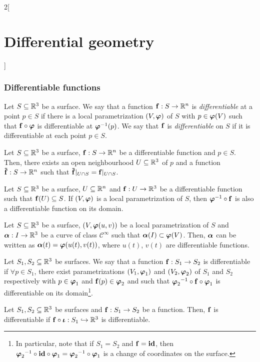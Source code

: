 \documentclass[../../../main_math.tex]{subfiles}
\begin{document}
\begin{multicols}{2}[\section{Differential geometry}]
  \subsubsection{Differentiable functions}
  \begin{definition}
    Let $S\subseteq\mathbb{R}^3$ be a surface. We say that a function $\boldsymbol{\mathrm{f}}:S\rightarrow \mathbb{R}^n$ is \emph{differentiable} at a point $p\in S$ if there is a local parametrization $(V,\boldsymbol{\mathrm{\varphi}})$ of $S$ with $p\in\boldsymbol{\mathrm{\varphi}}(V)$ such that $\boldsymbol{\mathrm{f}}\circ\boldsymbol{\mathrm{\varphi}}$ is differentiable at ${\boldsymbol{\mathrm{\varphi}}}^{-1}(p)$. We say that $\boldsymbol{\mathrm{f}}$ is \emph{differentiable} on $S$ if it is differentiable at each point $p\in S$.
  \end{definition}
  \begin{proposition}
    Let $S\subseteq\mathbb{R}^3$ be a surface, $\boldsymbol{\mathrm{f}}:S\rightarrow \mathbb{R}^n$ be a differentiable function and $p\in S$. Then, there exists an open neighbourhood $U\subseteq\mathbb{R}^3$ of $p$ and a function $\boldsymbol{\mathrm{\tilde{f}}}:S\rightarrow \mathbb{R}^n$ such that $\boldsymbol{\mathrm{\tilde{f}}}|_{U\cap S}=\boldsymbol{\mathrm{f}}|_{U\cap S}$.
  \end{proposition}
  \begin{corollary}
    Let $S\subseteq\mathbb{R}^3$ be a surface, $U\subseteq \mathbb{R}^n$ and $\boldsymbol{\mathrm{f}}:U\rightarrow \mathbb{R}^3$ be a differentiable function such that $\boldsymbol{\mathrm{f}}(U)\subseteq S$. If $(V,\boldsymbol{\mathrm{\varphi}})$ is a local parametrization of $S$, then ${\boldsymbol{\mathrm{\varphi}}}^{-1}\circ\boldsymbol{\mathrm{f}}$ is also a differentiable function on its domain.
  \end{corollary}
  \begin{corollary}
    Let $S\subseteq\mathbb{R}^3$ be a surface, $(V,\boldsymbol{\mathrm{\varphi}}(u,v))$ be a local parametrization of $S$ and $\boldsymbol{\mathrm{\alpha}}:I\rightarrow\mathbb{R}^3$ be a curve of class $\mathcal{C}^\infty$ such that $\boldsymbol{\mathrm{\alpha}}(I)\subset \boldsymbol{\mathrm{\varphi}}(V)$. Then, $\boldsymbol{\mathrm{\alpha}}$ can be written as $\boldsymbol{\mathrm{\alpha}}(t)=\boldsymbol{\mathrm{\varphi}}(u(t),v(t))$, where $u(t)$, $v(t)$ are differentiable functions.
  \end{corollary}
  \begin{definition}
    Let $S_1,S_2\subseteq\mathbb{R}^3$ be surfaces. We say that a function $\boldsymbol{\mathrm{f}}:S_1\rightarrow S_2$ is differentiable if $\forall p\in S_1$, there exist parametrizations $(V_1,\boldsymbol{\mathrm{\varphi}}_1)$ and $(V_2,\boldsymbol{\mathrm{\varphi}}_2)$ of $S_1$ and $S_2$ respectively with $p\in\boldsymbol{\mathrm{\varphi}}_1$ and $\boldsymbol{\mathrm{f}}(p)\in\boldsymbol{\mathrm{\varphi}}_2$ and such that ${\boldsymbol{\mathrm{\varphi}}_2}^{-1}\circ\boldsymbol{\mathrm{f}}\circ\boldsymbol{\mathrm{\varphi}}_1$ is differentiable on its domain\footnote{In particular, note that if $S_1=S_2$ and $\boldsymbol{\mathrm{f}}=\boldsymbol{\mathrm{\mathrm{id}}}$, then ${\boldsymbol{\mathrm{\varphi}}_2}^{-1}\circ\boldsymbol{\mathrm{\mathrm{id}}}\circ\boldsymbol{\mathrm{\varphi}}_1={\boldsymbol{\mathrm{\varphi}}_2}^{-1}\circ\boldsymbol{\mathrm{\varphi}}_1$ is a change of coordinates on the surface.}.
  \end{definition}
  \begin{proposition}
    Let $S_1,S_2\subseteq\mathbb{R}^3$ be surfaces and $\boldsymbol{\mathrm{f}}:S_1\rightarrow S_2$ be a function. Then, $\boldsymbol{\mathrm{f}}$ is differentiable if $\boldsymbol{\mathrm{f}}\circ\boldsymbol{\mathrm{\iota}}:S_1\hookrightarrow \mathbb{R}^3$ is differentiable.
  \end{proposition}

\end{multicols}
\end{document}
